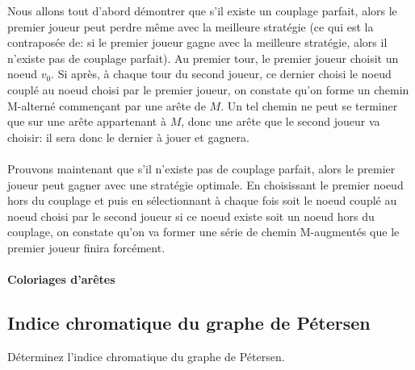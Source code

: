 \begin{solution}
Nous allons tout d'abord démontrer que s'il existe un couplage parfait, alors le premier joueur peut perdre même avec la meilleure stratégie (ce qui est la contraposée de: si le premier joueur gagne avec la meilleure stratégie, alors il n'existe pas de couplage parfait). Au premier tour, le premier joueur choisit un noeud $v_0$. Si après, à chaque tour du second joueur, ce dernier choisi le noeud couplé au noeud choisi par le premier joueur, on constate qu'on forme un chemin M-alterné commençant par une arête de $M$. Un tel chemin ne peut se terminer que sur une arête appartenant à $M$, donc une arête que le second joueur va choisir: il sera donc le dernier à jouer et gagnera.\\
\\
Prouvons maintenant que s'il n'existe pas de couplage parfait, alors le premier joueur peut gagner avec une stratégie optimale. En choisissant le premier noeud hors du couplage et puis en sélectionnant à chaque fois soit le noeud couplé au noeud choisi par le second joueur si ce noeud existe soit un noeud hors du couplage, on constate qu'on va former une série de chemin M-augmentés que le premier joueur finira forcément.
\end{solution}

\paragraph{Coloriages d'arêtes}

\subsection{Indice chromatique du graphe de Pétersen}
Déterminez l'indice chromatique du graphe de Pétersen.

